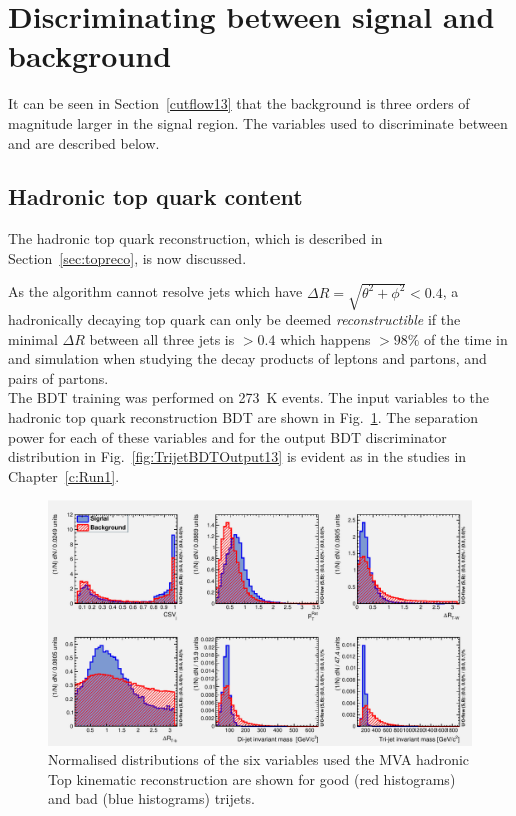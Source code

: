 \section{Discriminating between signal and background}
\label{sec:discriminating13}
It can be seen in Section~\ref{cutflow13} that the \ttbar background is three orders of magnitude larger in the signal region. The variables used to discriminate between \ttbar and \tttt are described below.

\subsection{Hadronic top quark content}
\label{sec:topContent13}
The hadronic top quark reconstruction, which is described in Section~\ref{sec:topreco}, is now discussed.

As the \antikt algorithm cannot resolve jets which have $\Delta R = \sqrt{  \theta^{2} + \phi^{2} } < 0.4$, a hadronically decaying top quark can only be deemed \emph{reconstructible} if the minimal $\Delta R$ between all three jets is $> 0.4$ which happens $> 98\%$ of the time in \ttbar and \tttt simulation when studying the decay products of leptons and partons, and pairs of partons.\\
The BDT training was performed on 273~K \ttbar events. The input variables to the hadronic top quark reconstruction BDT are shown in Fig.~\ref{fig:TrijetBDTInputFeatures13}. The separation power for each of these variables and for the output BDT discriminator distribution in Fig.~\ref{fig:TrijetBDTOutput13} is evident as in the \runone studies in Chapter~\ref{c:Run1}. 

\begin{figure}[ht!]
\centering
\includegraphics[width=\linewidth]{images/Run2/variables_id_c1.pdf}
\caption{Normalised distributions of the six variables used the MVA hadronic Top kinematic reconstruction are shown for good (red histograms) and bad (blue histograms) trijets.}
\label{fig:TrijetBDTInputFeatures13}
\end{figure}

